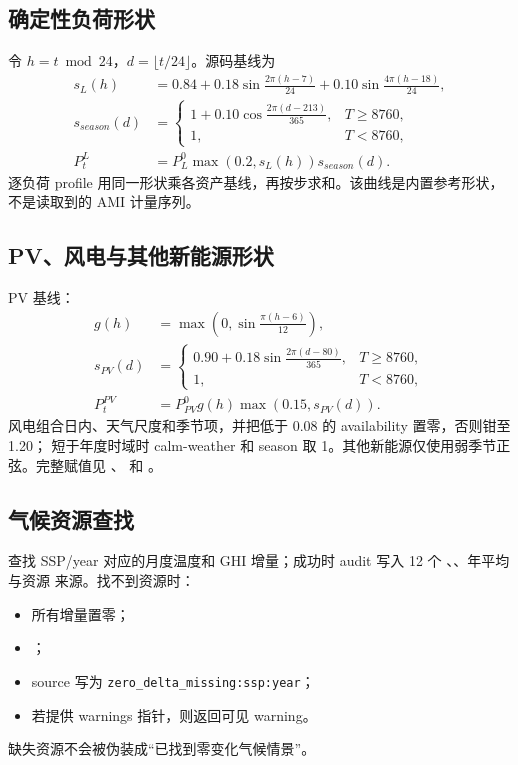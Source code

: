 \subsection{确定性负荷形状}
令 $h=t\bmod24$，$d=\lfloor t/24\rfloor$。源码基线为
\begin{align}
 s_L(h)&=0.84+0.18\sin\frac{2\pi(h-7)}{24}
              +0.10\sin\frac{4\pi(h-18)}{24},\\
 s_{season}(d)&=\begin{cases}
 1+0.10\cos\frac{2\pi(d-213)}{365},&T\ge8760,\\1,&T<8760,
 \end{cases}\\
 P^L_t&=P_L^0\max(0.2,s_L(h))s_{season}(d).
\end{align}
逐负荷 profile 用同一形状乘各资产基线，再按步求和。该曲线是内置参考形状，不是读取到的
AMI 计量序列。

\subsection{PV、风电与其他新能源形状}
PV 基线：
\begin{align}
 g(h)&=\max\left(0,\sin\frac{\pi(h-6)}{12}\right),\\
 s_{PV}(d)&=\begin{cases}0.90+0.18\sin\frac{2\pi(d-80)}{365},&T\ge8760,\\1,&T<8760,
 \end{cases}\\
 P^{PV}_t&=P_{PV}^0 g(h)\max(0.15,s_{PV}(d)).
\end{align}
风电组合日内、天气尺度和季节项，并把低于 0.08 的 availability 置零，否则钳至 1.20；
短于年度时域时 calm-weather 和 season 取 1。其他新能源仅使用弱季节正弦。完整赋值见
、 和
。

\subsection{气候资源查找}
 查找 SSP/year 对应的月度温度和 GHI 增量；成功时 audit
写入 12 个 、、年平均与资源
来源。找不到资源时：
\begin{itemize}
  \item 所有增量置零；
  \item {}；
  \item source 写为 \texttt{zero\_delta\_missing:ssp:year}；
  \item 若提供 warnings 指针，则返回可见 warning。
\end{itemize}
缺失资源不会被伪装成“已找到零变化气候情景”。

